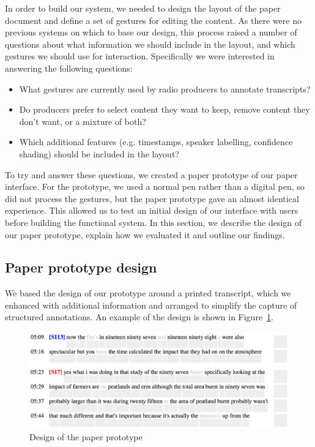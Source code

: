 In order to build our system, we needed to design the layout of the paper document and define a set of gestures for
editing the content.  As there were no previous systems on which to base our design, this process raised a number of
questions about what information we should include in the layout, and which gestures we should use for interaction.
Specifically we were interested in answering the following questions:

{\singlespacing
  \begin{itemize}
    \item What gestures are currently used by radio producers to annotate transcripts?
    \item Do producers prefer to select content they want to keep, remove content they don't want, or a mixture of both?
    \item Which additional features (e.g. timestamps, speaker labelling, confidence shading) should be included in the
      layout?
  \end{itemize}
}

To try and answer these questions, we created a paper prototype of our paper interface. For the prototype, we used a
normal pen rather than a digital pen, so did not process the gestures, but the paper prototype gave an almost identical
experience. This allowed us to test an initial design of our interface with users before building the functional
system.  In this section, we describe the design of our paper prototype, explain how we evaluated it and outline our
findings.

\subsection{Paper prototype design}

We based the design of our prototype around a printed transcript, which we enhanced with additional information and
arranged to simplify the capture of structured annotations. An example of the design is shown in
Figure~\ref{fig:paper-prototype-design}.

\begin{figure}[h]
  \centering
  \includegraphics[width=\columnwidth]{figs/paper-prototype-design}
  \caption{Design of the paper prototype}
  \label{fig:paper-prototype-design}
\end{figure}

